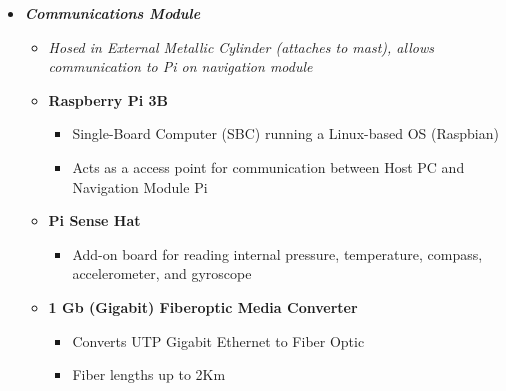 \documentclass[12pt]{article}
\begin{document}
{\begin{itemize}
\begin{itemize}
\begin{itemize}
							\item 12-Pin Com Connector (for fiber optic connection between navigation module and communication module, pins 8-12 unused)
							\item 16-Pin Auxiliary Connector (pins 4-16 unused)
							\item 16-Pin Thruster Connector (pins 16 unused)
							\item Pressure Sensor
						\end{itemize}
						\item[] \textbf{Misc.}
						\begin{itemize}
							\item Realtime Clock (I2C)
							\item Arduino Nano (read voltage)
							\item Power regulator
							\item Pi Camera V2\\\\
						\end{itemize}
					\end{itemize}
				\item \textbf{\textit{Communications Module}}
				\begin{itemize}
					\item[] \textit{Hosed in External Metallic Cylinder (attaches to mast), allows communication to Pi on navigation module\\}
					\item[] \textbf{Raspberry Pi 3B}
					\begin{itemize}
						\item Single-Board Computer (SBC) running a Linux-based OS (Raspbian)
						\item Acts as a access point for communication between Host PC and Navigation Module Pi
					\end{itemize}
					\item[] \textbf{Pi Sense Hat}
					\begin{itemize}
						\item Add-on board for reading internal pressure, temperature, compass, accelerometer, and gyroscope
					\end{itemize}
					\item[] \textbf{1 Gb (Gigabit) Fiberoptic Media Converter}
					\begin{itemize}
						\item Converts UTP Gigabit Ethernet to Fiber Optic
						\item Fiber lengths up to 2Km

\end{itemize}
\end{itemize}
\end{itemize}}
\end{document}
